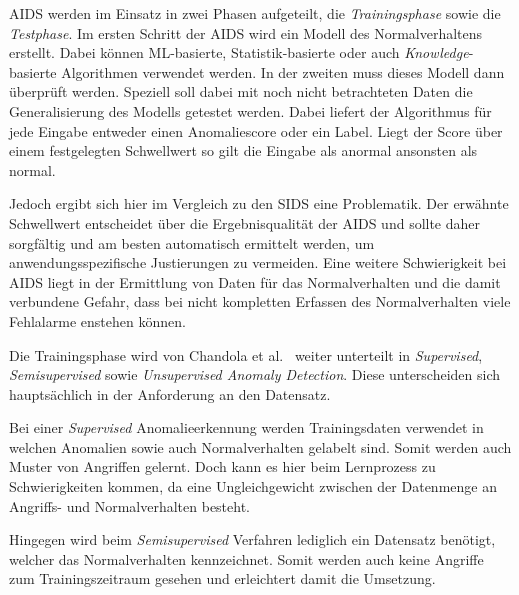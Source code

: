                 \ac{AIDS} werden im Einsatz in zwei Phasen aufgeteilt, die \textit{Trainingsphase} sowie die \textit{Testphase}.
                Im ersten Schritt der \ac{AIDS} wird ein Modell des Normalverhaltens erstellt.
                Dabei können ML-basierte, Statistik-basierte oder auch 
                \textit{Knowledge}-basierte  Algorithmen verwendet werden.
                In der zweiten muss dieses Modell dann überprüft werden.
                Speziell soll dabei mit noch nicht betrachteten Daten die Generalisierung des Modells getestet werden. 
                Dabei liefert der Algorithmus für jede Eingabe entweder einen Anomaliescore oder ein Label.
                Liegt der Score über einem festgelegten Schwellwert so gilt die Eingabe als anormal ansonsten als normal.

                Jedoch ergibt sich hier im Vergleich zu den \ac{SIDS} eine Problematik.
                Der erwähnte Schwellwert entscheidet über die Ergebnisqualität der \ac{AIDS} und sollte daher sorgfältig und am besten automatisch ermittelt werden, um anwendungsspezifische Justierungen zu vermeiden.
                Eine weitere Schwierigkeit bei \ac{AIDS} liegt in der Ermittlung von Daten für das Normalverhalten und die damit verbundene Gefahr, dass bei nicht kompletten Erfassen des Normalverhalten viele Fehlalarme enstehen können.


                Die Trainingsphase wird von Chandola et al.~\cite{ANOMALYSURVEY} weiter unterteilt in \textit{Supervised},
                \textit{Semisupervised} sowie \textit{Unsupervised Anomaly Detection}.
                Diese unterscheiden sich hauptsächlich in der Anforderung an den Datensatz. 
                
                Bei einer \textit{Supervised} Anomalieerkennung werden Trainingsdaten verwendet 
                in welchen Anomalien sowie auch Normalverhalten gelabelt sind.
                Somit werden auch Muster von Angriffen gelernt.
                Doch kann es hier beim Lernprozess zu Schwierigkeiten kommen, da eine Ungleichgewicht zwischen der Datenmenge an Angriffs- und Normalverhalten besteht.~\cite{IMBALANCEPHUA2004}
                
                Hingegen wird beim \textit{Semisupervised} Verfahren lediglich ein Datensatz benötigt,
                welcher das Normalverhalten kennzeichnet.
                Somit werden auch keine Angriffe zum Trainingszeitraum gesehen und erleichtert damit die Umsetzung.
                
